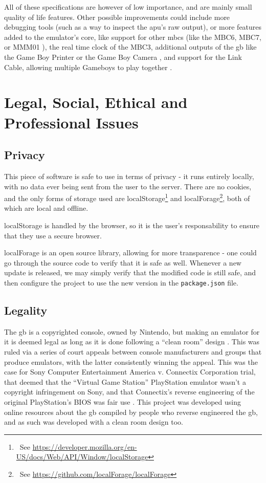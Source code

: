 \documentclass[11pt]{report}
\newcommand{\ftnt}[1]{\footnote{~See \url{#1}}}
\begin{document}
All of these specifications are however of low importance, and are mainly small quality of life features. Other possible improvements could include more debugging tools (such as a way to inspect the \gls{apu}'s raw output), or more features added to the emulator's core, like support for other \glspl{mbc} (like the MBC6, MBC7, or MMM01 \cite[MBCs]{pandoc}), the real time clock of the MBC3, additional outputs of the \gls{gb} like the Game Boy Printer or the Game Boy Camera \cite{pandoc}, and support for the Link Cable, allowing multiple Gameboys to play together \cite[Serial Data Transfer]{pandoc}.

\chapter{Legal, Social, Ethical and Professional Issues}

\section{Privacy}

This piece of software is safe to use in terms of privacy - it runs entirely locally, with no data ever being sent from the user to the server. There are no cookies, and the only forms of storage used are localStorage\ftnt{https://developer.mozilla.org/en-US/docs/Web/API/Window/localStorage} and localForage\ftnt{https://github.com/localForage/localForage}, both of which are local and offline. 

localStorage is handled by the browser, so it is the user's responsability to ensure that they use a secure browser. 

localForage is an open source library, allowing for more transparence - one could go through the source code to verify that it is safe as well. Whenever a new update is released, we may simply verify that the modified code is still safe, and then configure the project to use the new version in the \texttt{package.json} file.

\section{Legality}

The \glsdesc{gb} is a copyrighted console, owned by Nintendo, but making an emulator for it is deemed legal as long as it is done following a ``clean room'' design \cite{emulation_white_paper}. This was ruled via a series of court appeals between console manufacturers and groups that produce emulators, with the latter consistently winning the appeal. This was the case for Sony Computer Entertainment America v. Connectix Corporation trial, that deemed that the ``Virtual Game Station'' PlayStation emulator wasn't a copyright infringement on Sony, and that Connectix's reverse engineering of the original PlayStation's BIOS was fair use \cite{sony_v_connectix}. This project was developed using online resources about the \gls{gb} compiled by people who reverse engineered the \gls{gb}, and as such was developed with a clean room design too.
\end{document}
